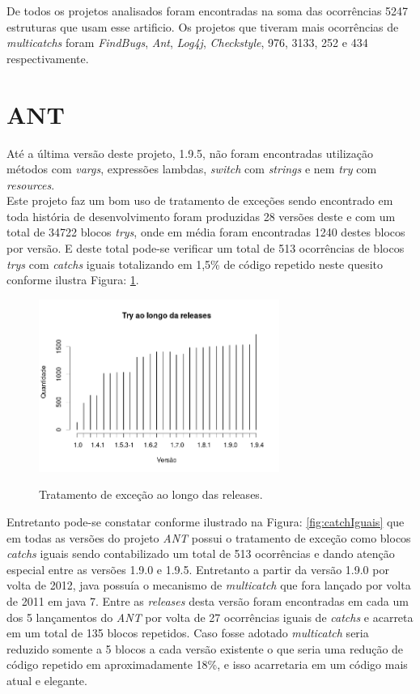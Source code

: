 De todos os projetos analisados foram encontradas na soma das ocorrências 5247 estruturas que usam esse artificio. Os projetos que tiveram mais ocorrências de \textit{multicatchs} foram \textit{FindBugs}, \textit{Ant}, \textit{Log4j}, \textit{Checkstyle}, 976, 3133, 252 e 434 respectivamente.\\

\section{ANT}
Até a última versão deste projeto, 1.9.5, não foram encontradas utilização métodos com \textit{vargs}, expressões lambdas, \textit{switch} com \textit{strings} e nem \textit{try} com \textit{resources}.\\

Este projeto faz um bom uso de tratamento de exceções sendo encontrado em toda história de desenvolvimento foram produzidas 28 versões deste e com um total de 34722 blocos \textit{trys}, onde em média foram encontradas 1240 destes blocos por versão. E deste total pode-se verificar um total de 513 ocorrências de blocos \textit{trys} com \textit{catchs} iguais totalizando em 1,5\% de código repetido neste quesito conforme ilustra Figura: \ref{fig:TrysAnt}.\\

	\begin{figure}[h]
		\center
		\includegraphics[width=0.7\textwidth]{Imagens/trysAnt}
		\label{fig:TrysAnt}
		\caption{Tratamento de exceção ao longo das releases.}
	\end{figure}

Entretanto pode-se constatar conforme ilustrado na Figura: \ref{fig:catchIguais} que em todas as versões do projeto \textit{ANT} possui o tratamento de exceção como blocos \textit{catchs} iguais sendo contabilizado um total de 513 ocorrências e dando atenção especial entre as versões 1.9.0 e 1.9.5. Entretanto a partir da versão 1.9.0 por volta de 2012, java possuía o mecanismo de \textit{multicatch} que fora lançado por volta de 2011 em java 7. Entre as \textit{releases} desta versão foram encontradas em cada um dos 5 lançamentos do \textit{ANT} por volta de 27 ocorrências iguais de \textit{catchs} e acarreta em um total de 135 blocos repetidos. Caso fosse adotado \textit{multicatch} seria reduzido somente a 5 blocos a cada versão existente o que seria uma redução de código repetido em aproximadamente 18\%, e isso acarretaria em um código mais atual e elegante.\\

